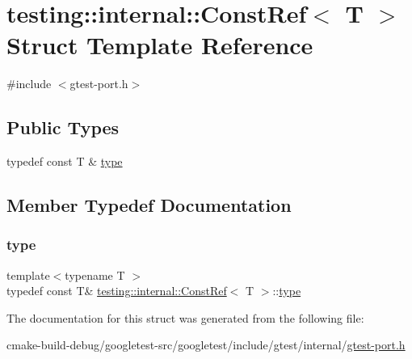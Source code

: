 \hypertarget{structtesting_1_1internal_1_1ConstRef}{}\section{testing\+::internal\+::Const\+Ref$<$ T $>$ Struct Template Reference}
\label{structtesting_1_1internal_1_1ConstRef}


{\ttfamily \#include $<$gtest-\/port.\+h$>$}

\subsection*{Public Types}
\begin{DoxyCompactItemize}
\item 
typedef const T \& \mbox{\hyperlink{structtesting_1_1internal_1_1ConstRef_a53610a4d0e72958332222b0a85f8937a}{type}}
\end{DoxyCompactItemize}


\subsection{Member Typedef Documentation}
\mbox{\label{structtesting_1_1internal_1_1ConstRef_a53610a4d0e72958332222b0a85f8937a}} 
\subsubsection{\texorpdfstring{type}{type}}
{\footnotesize\ttfamily template$<$typename T $>$ \\
typedef const T\& \mbox{\hyperlink{structtesting_1_1internal_1_1ConstRef}{testing\+::internal\+::\+Const\+Ref}}$<$ T $>$\+::\mbox{\hyperlink{structtesting_1_1internal_1_1ConstRef_a53610a4d0e72958332222b0a85f8937a}{type}}}



The documentation for this struct was generated from the following file\+:\begin{DoxyCompactItemize}
\item 
cmake-\/build-\/debug/googletest-\/src/googletest/include/gtest/internal/\mbox{\hyperlink{gtest-port_8h}{gtest-\/port.\+h}}\end{DoxyCompactItemize}
